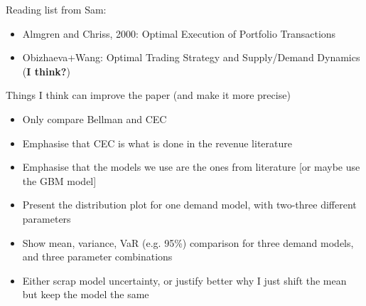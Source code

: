 \documentclass[a4paper,12pt]{article}
\begin{document}
Reading list from Sam:
\begin{itemize}
\item Almgren and Chriss, 2000: Optimal Execution of Portfolio
  Transactions
\item Obizhaeva+Wang: Optimal Trading Strategy
and
Supply/Demand Dynamics (\textbf{I think?})
\end{itemize}

Things I think can improve the paper (and make it more precise)
\begin{itemize}
\item Only compare Bellman and CEC
\item Emphasise that CEC is what is done in the revenue literature
\item Emphasise that the models we use are the ones from literature
  [or maybe use the GBM model]
\item Present the distribution plot for one demand model, with
  two-three different parameters
\item Show mean, variance, VaR (e.g. 95\%) comparison for three demand
  models, and three parameter combinations
\item Either scrap model uncertainty, or justify better why I just
  shift the mean but keep the model the same
\end{itemize}






% 


\clearpage





\end{document}
